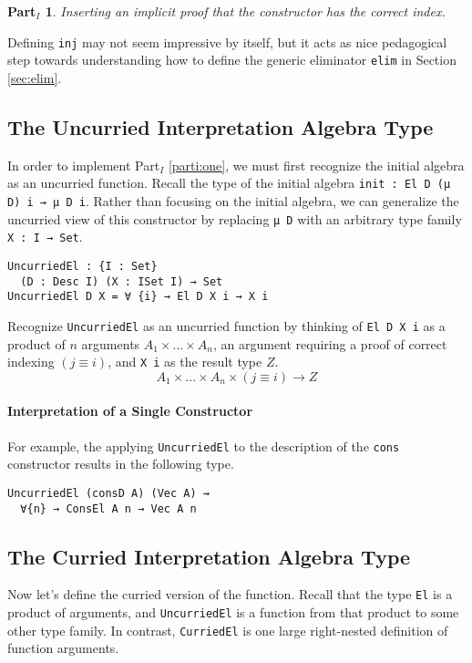 \documentclass[preprint,nonatbib]{sigplanconf}
\newtheorem{myparti}{Part$_I$}
\newcommand{\refsec}[1]{Section \ref{sec:#1}}
\newcommand{\refparti}[1]{Part$_I$ \ref{parti:#1}}
\begin{document}
\begin{myparti}
\label{parti:two}
Inserting an implicit proof that the constructor has the correct index.
\end{myparti}

Defining {\tt inj} may not seem impressive by itself, but it acts as
nice pedagogical step towards understanding how to define the generic
eliminator {\tt elim} in \refsec{elim}.

\subsection{The Uncurried Interpretation Algebra Type}

In order to implement \refparti{one}, we must first recognize the
initial algebra as an uncurried function. Recall the type of the
initial algebra {\tt init : El D (μ D) i → μ D i}. Rather than
focusing on the initial algebra, we can generalize the uncurried view
of this constructor by replacing {\tt μ D} with an arbitrary
type family {\tt X : I → Set}.

\begin{verbatim}
UncurriedEl : {I : Set}
  (D : Desc I) (X : ISet I) → Set
UncurriedEl D X = ∀ {i} → El D X i → X i
\end{verbatim}

Recognize {\tt UncurriedEl} as an uncurried function by thinking of
{\tt El D X i} as a product of $n$ arguments $A_1 × ... × A_n$, an
argument requiring a proof of correct indexing $(j≡i)$, and
{\tt X i} as the result type $Z$.
\[
A_1 × ... × A_n × (j ≡ i) → Z
\]

\paragraph{Interpretation of a Single Constructor}

For example, the applying {\tt UncurriedEl} to the description of the
{\tt cons} constructor results in the following type.

\begin{verbatim}
UncurriedEl (consD A) (Vec A) ⇝
  ∀{n} → ConsEl A n → Vec A n
\end{verbatim}

\subsection{The Curried Interpretation Algebra Type}

Now let's define the curried version of the function. Recall that the
type {\tt El} is a product of arguments, and {\tt UncurriedEl} is a
function from that product to some other type family. In contrast,
{\tt CurriedEl} is one large right-nested definition of function
arguments.
\end{document}

